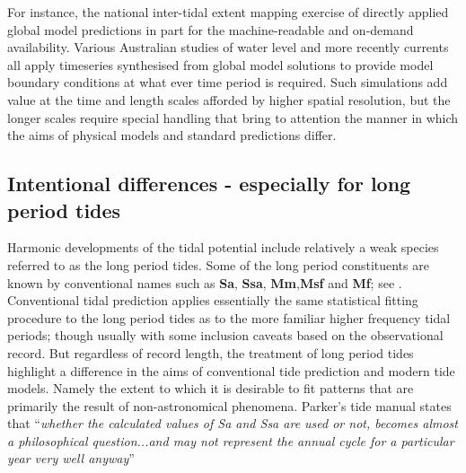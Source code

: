 For instance, the national inter-tidal extent mapping exercise of \citet{10.3390/rs10030480}  directly applied global model predictions in part for the machine-readable and on-demand availability.
Various Australian studies of water level \citep{Haigh:2013bn}\citep{Pattiaratchi2018} and more recently currents \citep{10.5194/os-2020-107} all apply timeseries synthesised from global model solutions to provide model boundary conditions at what ever time period is required.    Such simulations add value at the time and length scales afforded by higher spatial resolution, but the longer scales require special handling that bring to attention the manner in which the aims of physical models and standard predictions differ.

\subsection{Intentional differences - especially for long period tides}
Harmonic developments of the tidal potential include relatively a weak species referred to as the long period tides.  Some of the long period constituents are known by conventional names such as \textbf{Sa}, \textbf{Ssa}, \textbf{Mm},\textbf{Msf} and \textbf{Mf}; see \cite[table 4] {10.1016/b978-0-444-53802-4.00058-0}.
Conventional tidal prediction applies essentially the same statistical fitting procedure to the long period tides as to the more familiar higher frequency tidal periods; though usually with some inclusion caveats based on the observational record. 
But regardless of record length, the treatment of long period tides highlight a difference in the aims of conventional tide prediction and modern tide models.   Namely the extent to which it is desirable to fit patterns that are primarily the result of non-astronomical phenomena.
Parker's tide manual states that ``\textit{whether the calculated values of Sa and Ssa are used or not, becomes almost a philosophical question...and may not represent the annual cycle for a particular year very well anyway}''  \citep[Section 3.7]{Parker:2007wq} 

